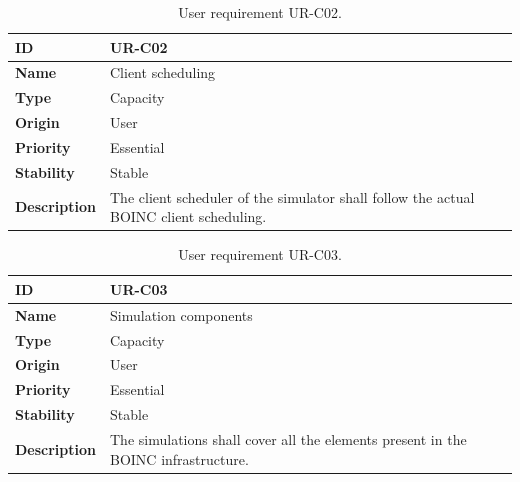 
\begin{center}
\begin{table}[htbp]
\centering
\begin{tabular}{@{}p{2.5cm} p{9cm}@{}} 
\toprule
\textbf{ID} 				& UR-C02\\
\midrule
\textbf{Name} 			& Client \gls{scheduling} \\
\midrule
\textbf{Type} 			& Capacity \\
\midrule
\textbf{Origin} 			& User \\
\midrule
\textbf{Priority}		& Essential \\
\midrule
\textbf{Stability} 		& Stable \\
\midrule
\textbf{Description} 	& The client scheduler of the simulator shall follow the actual BOINC client \gls{scheduling}. \\
\bottomrule
\end{tabular}
\caption{User requirement UR-C02.}
\label{tab:urc02}
\end{table}
\end{center}

\begin{center}
\begin{table}[htbp]
\centering
\begin{tabular}{@{}p{2.5cm} p{9cm}@{}} 
\toprule
\textbf{ID} 				& UR-C03\\
\midrule
\textbf{Name} 			& Simulation components \\
\midrule
\textbf{Type} 			& Capacity \\
\midrule
\textbf{Origin} 			& User \\
\midrule
\textbf{Priority}		& Essential \\
\midrule
\textbf{Stability} 		& Stable \\
\midrule
\textbf{Description} 	& The simulations shall cover all the elements present in the BOINC infrastructure. \\
\bottomrule
\end{tabular}
\caption{User requirement UR-C03.}
\label{tab:urc03}
\end{table}
\end{center}

